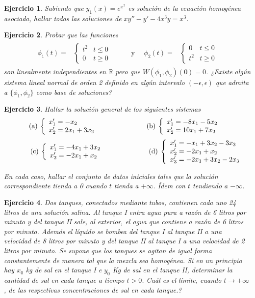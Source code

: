 \documentclass[11pt,a4paper,pdftex]{amsart}
\newtheorem{ej}{Ejercicio}%
\numberwithin{equation}{section}%
\newcommand{\bej}[1]{\begin{ej}\rm{#1}}
\newcommand{\eej}{\end{ej}\vspace{-0.2cm}}
\newcommand{\ba}{\begin{array}}
\newcommand{\ea}{\end{array}}
\newcommand{\R}{\mathbb R}
\newcommand{\0}{\mathbb O}
\newcommand{\8}{\infty}
\begin{document}
\bej Sabiendo que $y_{1}(x)=e^{x^2}$ es
soluci\'on de la ecuaci\'on homog\'enea asociada, hallar todas las
soluciones de $xy''-y'-4x^3y=x^3$.

\eej

\bej Probar que las funciones
\[
\begin{array}{cc}
\begin{array}{ll}
\phi _{1}(t)= &\left\{ \begin{array}{ll}
t^{2}&t \le 0\\
0&t\geq 0
\end{array}
\right.
\end{array}
&
\begin{array}{ll}
\quad \text{ y }\quad \phi _{2}(t)= &\left\{ \begin{array}{ll}
0&t \le 0\\
t^{2}&t\geq 0
\end{array}
\right.
\end{array}
\end{array}
\]
son linealmente independientes en $\R$ pero que $W(\phi_{1}, \phi_{2})(0)=0$.
¿Existe algún sistema lineal normal de orden 2 definido en algún intervalo
$(-\epsilon, \epsilon)$ que admita a $\{ \phi_{1}, \phi_{2}\}$ como base de
soluciones?
\eej


\bej Hallar la soluci\'on general de los siguientes sistemas
$$
\hskip-.2cm\text{(a)}\: \left\{\ba{l} x_1'=-x_2 \\x_2'=2x_1+3x_2 \ea \right.\qquad\qquad\qquad
\hskip.3cm\text{(b)}\: \left\{\ba{l} x_1'=-8x_1-5x_2\\x_2'=10x_1+7x_2\ea\right.
$$
$$
\hskip1cm\text{(c)}\: \left\{\ba{l}  x_1'=-4x_1+3x_2 \\x_2'=-2x_1+x_2\ea\right.\qquad\hskip1.5cm
\text{(d)}\:\left\{\ba{l} x_1'=-x_1+3x_2-3x_3\\   x_2'=-2x_1+x_2\\ x_3'=-2x_1+3x_2-2x_3
\ea\right.
$$

En cada caso, hallar el conjunto de datos iniciales tales que la
solución correspondiente tienda a 0 cuando $t$ tienda a
$+\infty$. Ídem con $t$ tendiendo a $-\infty$.

\eej

\bej Dos tanques, conectados mediante tubos, contienen cada uno 24 litros de una soluci\'on salina. Al tanque I entra agua pura a raz\'on de 6 litros por minuto y del tanque II sale, al exterior, el agua que contiene a raz\'on de 6 litros por minuto. Adem\'as el l\'iquido se bombea del tanque I al tanque II a
una velocidad de 8 litros por minuto y del tanque II al tanque I a una
velocidad de 2 litros por minuto. Se supone que los tanques se agitan de igual forma constantemente de manera tal que la mezcla sea homog\'enea. Si en un principio hay $x_0$ kg de sal en el tanque I e $y_0$ Kg de sal en el tanque II, determinar la cantidad de sal en cada tanque a tiempo $t>0$. Cu\'al es el l\'imite, cuando $t\to +\infty$, de las respectivas concentraciones de sal en cada tanque.?
\eej
\end{document}
